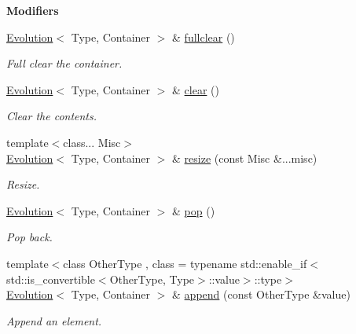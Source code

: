 \begin{Indent}{\bf Modifiers}\par
\begin{DoxyCompactItemize}
\item 
\hyperlink{exceptionmagrathea_1_1Evolution}{Evolution}$<$ Type, Container $>$ \& \hyperlink{exceptionmagrathea_1_1Evolution_a9318c84e14994a51a9a2d13051481b48}{fullclear} ()
\begin{DoxyCompactList}\small\item\em Full clear the container. \end{DoxyCompactList}\item 
\hyperlink{exceptionmagrathea_1_1Evolution}{Evolution}$<$ Type, Container $>$ \& \hyperlink{exceptionmagrathea_1_1Evolution_a077a33fd71a07421ed68ed3b58f04675}{clear} ()
\begin{DoxyCompactList}\small\item\em Clear the contents. \end{DoxyCompactList}\item 
{\footnotesize template$<$class... Misc$>$ }\\\hyperlink{exceptionmagrathea_1_1Evolution}{Evolution}$<$ Type, Container $>$ \& \hyperlink{exceptionmagrathea_1_1Evolution_ab69c31b8498817b771503b9775399fe4}{resize} (const Misc \&...misc)
\begin{DoxyCompactList}\small\item\em Resize. \end{DoxyCompactList}\item 
\hyperlink{exceptionmagrathea_1_1Evolution}{Evolution}$<$ Type, Container $>$ \& \hyperlink{exceptionmagrathea_1_1Evolution_a764dce9ab9a8c44dbf4a35c9bae8b6b5}{pop} ()
\begin{DoxyCompactList}\small\item\em Pop back. \end{DoxyCompactList}\item 
{\footnotesize template$<$class Other\-Type , class  = typename std\-::enable\-\_\-if$<$std\-::is\-\_\-convertible$<$\-Other\-Type, Type$>$\-::value$>$\-::type$>$ }\\\hyperlink{exceptionmagrathea_1_1Evolution}{Evolution}$<$ Type, Container $>$ \& \hyperlink{exceptionmagrathea_1_1Evolution_a76fc41627007d1deb2777969593d3b63}{append} (const Other\-Type \&value)
\begin{DoxyCompactList}\small\item\em Append an element. \end{DoxyCompactList}\end{DoxyCompactItemize}
\end{Indent}
